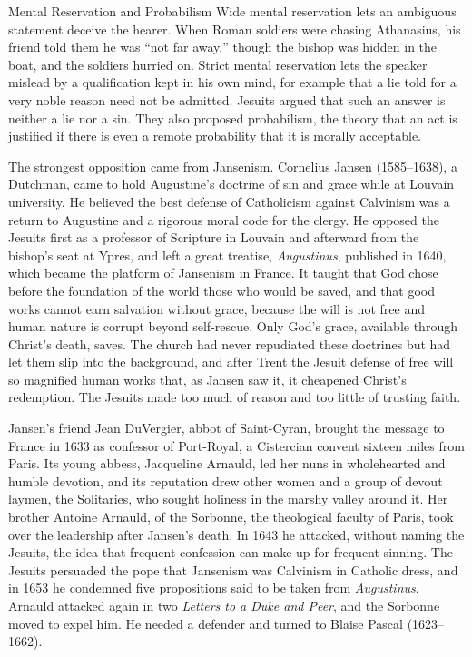 \begin{sidebox}{Mental Reservation and Probabilism}
Wide mental reservation lets an ambiguous statement deceive the hearer. When Roman soldiers were
chasing Athanasius, his friend told them he was ``not far away,'' though the bishop was hidden in the
boat, and the soldiers hurried on. Strict mental reservation lets the speaker mislead by a
qualification kept in his own mind, for example that a lie told for a very noble reason need not be
admitted. Jesuits argued that such an answer is neither a lie nor a sin. They also proposed
probabilism, the theory that an act is justified if there is even a remote probability that it is
morally acceptable.
\end{sidebox}

The strongest opposition came from Jansenism. Cornelius Jansen (1585--1638), a Dutchman, came to hold Augustine's doctrine of sin and grace while at Louvain university. He believed the best defense of
Catholicism against Calvinism was a return to Augustine and a rigorous moral code for the clergy. He opposed the Jesuits first as a professor of Scripture in Louvain and afterward from the bishop's seat at Ypres, and left a great
treatise, \emph{Augustinus}, published in 1640, which became the platform of Jansenism in France. It
taught that God chose before the foundation of the world those who would be saved, and that good
works cannot earn salvation without grace, because the will is not free and human nature is corrupt
beyond self-rescue. Only God's grace, available through Christ's death, saves. The church had never
repudiated these doctrines but had let them slip into the background, and after Trent the Jesuit
defense of free will so magnified human works that, as Jansen saw it, it cheapened Christ's
redemption. The Jesuits made too much of reason and too little of trusting faith.

Jansen's friend Jean DuVergier, abbot of Saint-Cyran, brought the message to France in 1633 as
confessor of Port-Royal, a Cistercian convent sixteen miles from Paris. Its young abbess, Jacqueline
Arnauld, led her nuns in wholehearted and humble devotion, and its reputation drew other women and a
group of devout laymen, the Solitaries, who sought holiness in the marshy valley around it. Her
brother Antoine Arnauld, of the Sorbonne, the theological faculty of Paris, took over the leadership
after Jansen's death. In 1643 he attacked, without naming the Jesuits, the idea that frequent
confession can make up for frequent sinning. The Jesuits persuaded the pope that Jansenism was
Calvinism in Catholic dress, and in 1653 he condemned five propositions said to be taken from
\emph{Augustinus}. Arnauld attacked again in two \emph{Letters to a Duke and Peer}, and the Sorbonne
moved to expel him. He needed a defender and turned to Blaise Pascal (1623--1662).


